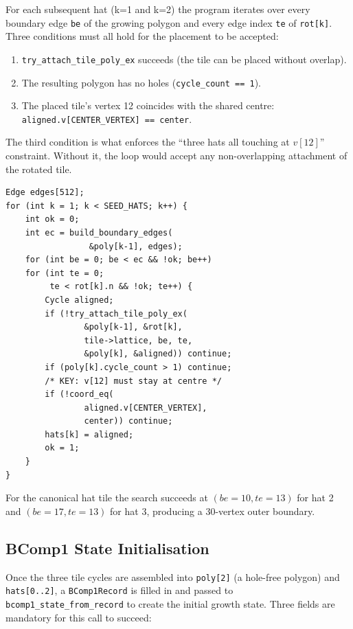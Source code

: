 \documentclass[10pt,a4paper]{article}
\let\polysubsection\subsection
\renewcommand\subsection{\needspace{0.12\textheight}\polysubsection}
\newcommand{\code}[1]{\texttt{\small #1}}
\begin{document}
\begin{tcolorbox}[dualbox, title={Attachment loop for \code{k = 1, 2}}]
  For each subsequent hat (k=1 and k=2) the program iterates over every
  boundary edge \code{be} of the growing polygon and every edge index
  \code{te} of \code{rot[k]}.  Three conditions must all hold for the
  placement to be accepted:
  \begin{enumerate}
    \item \code{try\_attach\_tile\_poly\_ex} succeeds (the tile can be placed
      without overlap).
    \item The resulting polygon has no holes
      (\code{cycle\_count == 1}).
    \item The placed tile's vertex 12 coincides with the shared centre:
      \code{aligned.v[CENTER\_VERTEX] == center}.
  \end{enumerate}
  The third condition is what enforces the ``three hats all touching at
  $v[12]$'' constraint.  Without it, the loop would accept any non-overlapping
  attachment of the rotated tile.
\tcblower
\begin{verbatim}
Edge edges[512];
for (int k = 1; k < SEED_HATS; k++) {
    int ok = 0;
    int ec = build_boundary_edges(
                 &poly[k-1], edges);
    for (int be = 0; be < ec && !ok; be++)
    for (int te = 0;
         te < rot[k].n && !ok; te++) {
        Cycle aligned;
        if (!try_attach_tile_poly_ex(
                &poly[k-1], &rot[k],
                tile->lattice, be, te,
                &poly[k], &aligned)) continue;
        if (poly[k].cycle_count > 1) continue;
        /* KEY: v[12] must stay at centre */
        if (!coord_eq(
                aligned.v[CENTER_VERTEX],
                center)) continue;
        hats[k] = aligned;
        ok = 1;
    }
}
\end{verbatim}
\end{tcolorbox}

\noindent For the canonical hat tile the search succeeds at
$(be=10, te=13)$ for hat 2 and $(be=17, te=13)$ for hat 3, producing
a 30-vertex outer boundary.

\subsection{BComp1 State Initialisation}

Once the three tile cycles are assembled into \code{poly[2]} (a hole-free
polygon) and \code{hats[0..2]}, a \code{BComp1Record} is filled in and
passed to \code{bcomp1\_state\_from\_record} to create the initial growth
state.  Three fields are mandatory for this call to succeed:
\end{document}
